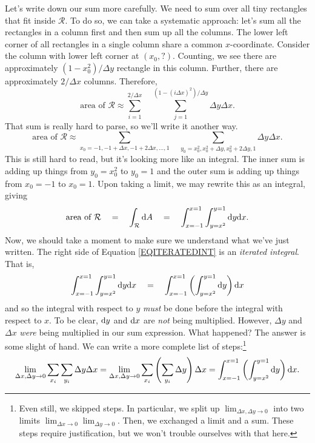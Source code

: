 Let's write down our sum more carefully.  We need to sum over all tiny rectangles that fit inside
$\mathcal R$.  To do so, we can take a systematic approach: let's sum all the rectangles
in a column first and then sum up all the columns.  The lower left corner of all 
rectangles in a single column share a common $x$-coordinate.  Consider
the column with lower left corner at $(x_0,?)$.  Counting, we see there
are approximately $(1-x_0^2)/\Delta y$ rectangle in this column.  Further, there are approximately
$2/\Delta x$ columns.  Therefore,
\[
	\text{area of }\mathcal R\approx 
	\sum_{i=1}^{2/\Delta x}\quad\sum_{j=1}^{(1-(i\Delta x)^2)/\Delta y} \Delta y\Delta x.
\]
That sum is really hard to parse, so we'll write it another way.
\[
	\text{area of }\mathcal R\approx
	\sum_{x_0=-1,-1+\Delta x,-1+2\Delta x,\ldots,1}
	\quad
	\sum_{y_0=x_0^2,x_0^2+\Delta y,x_0^2+2\Delta y,1}
	\Delta y\Delta x.
\]
This is still hard to read, but it's looking more like an integral.  The inner sum
is adding up things from $y_0=x_0^2$ to $y_0=1$ and the outer sum is adding up
things from $x_0=-1$ to $x_0=1$.  Upon taking a limit, we may rewrite this as an
integral, giving
\begin{equation}
	\label{EQITERATEDINT}
	\text{area of }\mathcal R\quad
	=\quad
	\int_{\mathcal R}\mathrm{d} A \quad =\quad \int_{x=-1}^{x=1}\int_{y=x^2}^{y=1} \mathrm{d} y\mathrm{d} x.
\end{equation}
Now, we should take a moment to make sure we understand what we've just written.  The
right side of Equation \eqref{EQITERATEDINT} is an \emph{iterated integral}.
That is,
\[
	\int_{x=-1}^{x=1}\int_{y=x^2}^{y=1} \mathrm{d} y\mathrm{d} x
	\quad 
	=
	\quad \int_{x=-1}^{x=1}\left(\int_{y=x^2}^{y=1} \mathrm{d} y\right)\mathrm{d} x
\]
and so the integral with respect to $y$ \emph{must} be done before the integral with respect to $x$.
To be clear, $\mathrm{d} y$ and $\mathrm{d} x$ are \emph{not} being multiplied.  However, $\Delta y$ and $\Delta x$ 
\emph{were} being multiplied in our sum expression.  What happened?  The answer is some slight of
hand.  We can write a more complete list of steps:\footnote{ Even still, we skipped steps.
In particular, we split up $\lim_{\Delta x,\Delta y\to 0}$ into two limits 
$\lim_{\Delta x\to 0}\lim_{\Delta y\to 0}$.  Then, we exchanged a limit and a sum.  These
steps require justification, but we won't trouble ourselves with that here.}
\[
	\lim_{\Delta x,\Delta y\to 0} \sum_{x_i}\sum_{y_i} \Delta y\Delta x
	=
	\lim_{\Delta x,\Delta y\to 0} \sum_{x_i}\left(\sum_{y_i} \Delta y\right)\Delta x
	=\int_{x=-1}^{x=1}\left(\int_{y=x^2}^{y=1} \mathrm{d} y\right)\mathrm{d} x.
\]

